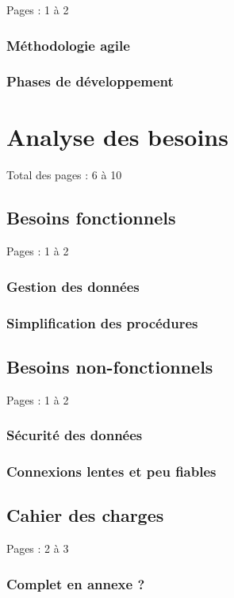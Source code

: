\documentclass{eplmastersthesis_FR}
\begin{document}
			Pages : 1 à 2

			\subsection*{Méthodologie agile}
			\subsection*{Phases de développement}

	\chapter{Analyse des besoins}

		Total des pages : 6 à 10

		\section{Besoins fonctionnels}

			Pages : 1 à 2

			\subsection*{Gestion des données}
			\subsection*{Simplification des procédures}

		\section{Besoins non-fonctionnels}

			Pages : 1 à 2

			\subsection*{Sécurité des données}
			\subsection*{Connexions lentes et peu fiables}

		\section{Cahier des charges}

			Pages : 2 à 3

			\subsection*{Complet en annexe ?}
\end{document}
